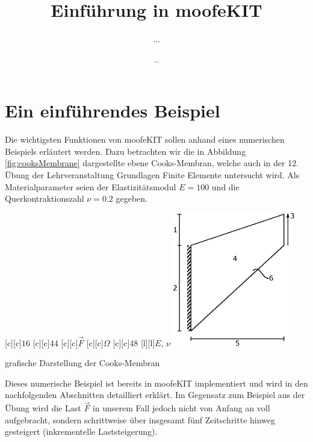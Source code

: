 \documentclass[12pt,bibstyle=none,pagenumberinfooter]{ifmdocument}
\author{...}
\title{Einf\"uhrung in moofeKIT}
\date{\the\day.\the\month.\the\year}
\begin{document}
	\maketitle
\section{Ein einführendes Beispiel}
Die wichtigsten Funktionen von moofeKIT sollen anhand eines numerischen Beispiels erläutert werden. Dazu betrachten wir die in Abbildung \ref{fig:cooksMembrane} dargestellte ebene Cooks-Membran, welche auch in der 12. \"Ubung der Lehrveranstaltung Grundlagen Finite Elemente untersucht wird. Als Materialparameter seien der Elastizit\"atsmodul $E=100$ und die Querkontraktionszahl $\nu=0.2$ gegeben.

\begin{myfigure}
	{
		{\footnotesize $16$}
		{\footnotesize$44$}
		{\footnotesize$\vec{F}$}
		{\footnotesize $\Omega$}
		{\footnotesize$48$}
		{\footnotesize $E,\,\nu$}
		\includegraphics[width=0.4\textwidth]{cooksMembrane}
	}
	\caption{grafische Darstellung der Cooks-Membran}
	\label{fig:cooksMembrane}
\end{myfigure}
Dieses numerische Beispiel ist bereits in moofeKIT implementiert und wird in den nachfolgenden Abschnitten detailliert erklärt. Im Gegensatz zum Beispiel aus der Übung wird die Last $\vec{F}$ in unserem Fall jedoch nicht von Anfang an voll aufgebracht, sondern schrittweise über insgesamt fünf Zeitschritte hinweg gesteigert (inkrementelle Laststeigerung). 
\end{document}
